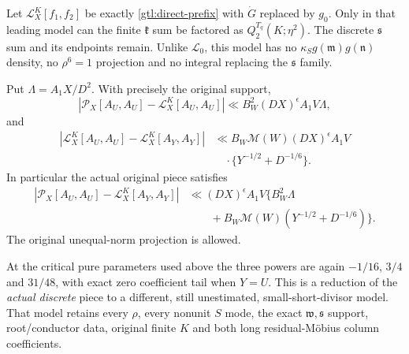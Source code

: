 Let $\mathcal L_X^K[f_1,f_2]$ be exactly
\eqref{gtl:direct-prefix} with $\dot G$ replaced by $g_0$.
Only in that leading model can the finite $\mathfrak k$ sum
be factored as $Q_2^{T_q}(K;\eta^2)$.
The discrete $\mathfrak s$ sum and its endpoints remain.
Unlike $\mathcal L_0$, this model has no
$\kappa_S g(\mathfrak m)g(\mathfrak n)$ density, no
$\rho^6=1$ projection and no integral replacing the
$\mathfrak s$ family.

\begin{proposition}
\label{gtl:direct}
Put $\Lambda=A_1X/D^2$. With precisely the original support,
\begin{equation}\label{gtl:direct-model-error}
 |\mathcal P_X[A_U,A_U]-\mathcal L_X^K[A_U,A_U]|
       \ll B_W^2(DX)^\epsilon A_1V\Lambda ,
\end{equation}
and
\begin{equation}\label{gtl:direct-model-tail}
 \begin{split}
 |\mathcal L_X^K[A_U,A_U]-\mathcal L_X^K[A_Y,A_Y]|
 &\ll B_W\mathcal M(W)(DX)^\epsilon A_1V\\
 &\quad\cdot\{Y^{-1/2}+D^{-1/6}\}.
 \end{split}
\end{equation}
In particular the actual original piece satisfies
\begin{equation}\label{gtl:direct-bound}
 \begin{split}
 |\mathcal P_X[A_U,A_U]-\mathcal L_X^K[A_Y,A_Y]|
 &\ll (DX)^\epsilon A_1V
       \{B_W^2\Lambda\\
 &\qquad+B_W\mathcal M(W)(Y^{-1/2}+D^{-1/6})\}.
 \end{split}
\end{equation}
The original unequal-norm projection is allowed.
\end{proposition}
At the critical pure parameters used above the three powers
are again $-1/16$, $3/4$ and $31/48$, with exact zero
coefficient tail when $Y=U$. This is a reduction of the
\emph{actual discrete} piece to a different, still unestimated,
small-short-divisor model. That model retains every $\rho$,
every nonunit $S$ mode, the exact $\mathfrak w,\mathfrak s$
support, root/conductor data, original finite $K$ and both
long residual-M\"obius column coefficients.

